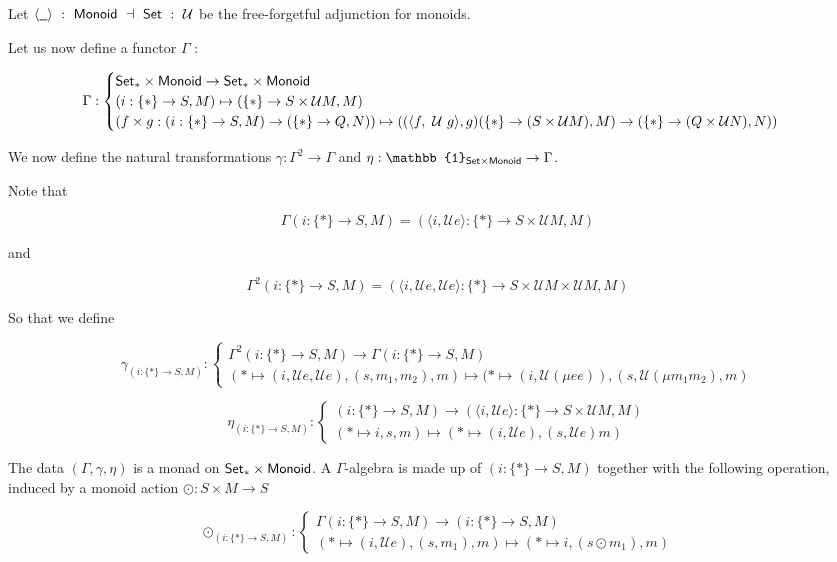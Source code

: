 Let $\langle \wcard \rangle ~:~\Monoid~\dashv ~\Set~ :~ \mathcal{U}$ be the free-forgetful adjunction
for monoids.

Let us now define a functor $\Gamma$ :

\[ \Gamma : \begin{cases}
  \mathsf{Set}_{*} \times \mathsf{Monoid} \to \mathsf{Set}_{*} \times \mathsf{Monoid}  \\
  (i : \{*\} \to S, M) \mapsto (\{*\} \to S \times \mathcal{U} M, M) \\
  (f \times g : (i : \{*\} \to S, M) \to (\{*\} \to Q, N)) \mapsto
    ((\langle f,~\mathcal{U}~g \rangle, g)  (\{*\} \to (S \times \mathcal{U} M), M) \to (\{*\} \to (Q \times \mathcal{U} N), N))
\end{cases} \]

We now define the natural transformations $\gamma : \Gamma^2 \to \Gamma$ and
$\eta : \mathbb{1}_{\Set \times \Monoid} \to \Gamma$.

Note that

\[ \Gamma (i : \{*\} \to S, M) = (\langle i, \mathcal{U} e\rangle : \{*\} \to S \times \mathcal{U} M, M) \]

and

\[\Gamma^2 (i : \{*\} \to S, M) =
(\langle i, \mathcal{U} e, \mathcal{U} e\rangle : \{*\} \to S \times \mathcal{U} M \times \mathcal{U} M, M) \]

So that we define

\[ \gamma_{(i : \{*\} \to S, M)} : \begin{cases}
   \Gamma^2 (i : \{*\} \to S, M) \to \Gamma (i : \{*\} \to S, M)
  \\
  (* \mapsto (i, \mathcal{U} e, \mathcal{U} e), (s, m_1, m_2), m) \mapsto (* \mapsto (i, \mathcal{U} (\mu e e)), (s, \mathcal{U} (\mu m_1 m_2), m)
\end{cases} \]

\[ \eta_{(i : \{*\} \to S, M)} : \begin{cases}
  (i : \{*\} \to S, M) \to (\langle i, \mathcal{U} e\rangle : \{*\} \to S \times \mathcal{U} M, M)  \\
  (* \mapsto i, s, m) \mapsto (* \mapsto (i, \mathcal{U} e), (s, \mathcal{U} e) m)
\end{cases} \]

The data $(\Gamma, \gamma, \eta)$ is a monad on $\mathsf{Set}_{*} \times \mathsf{Monoid}$. A $\Gamma$-algebra
is made up of $(i : \{*\} \to S, M)$ together with the following operation, induced
by a monoid action $\odot : S \times M \to S$

\[ \odot_{(i : \{*\} \to S, M)} : \begin{cases}
  \Gamma (i : \{*\} \to S, M) \to (i : \{*\} \to S, M) \\
  (* \mapsto (i, \mathcal{U} e), (s, m_1), m) \mapsto (* \mapsto i, (s \odot m_1), m)
\end{cases} \]

